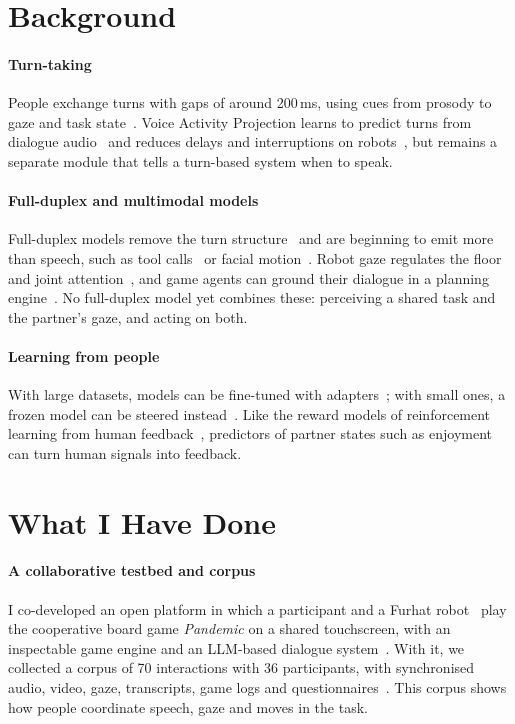 \documentclass[sigconf,review,anonymous,nonacm]{acmart}
\begin{document}
\section{Background}

\paragraph{Turn-taking} People exchange turns with gaps of around 200\,ms, using cues from prosody to gaze and task state~\cite{skantze2021turn}. Voice Activity Projection learns to predict turns from dialogue audio~\cite{ekstedt2022vap} and reduces delays and interruptions on robots~\cite{skantze2025applying}, but remains a separate module that tells a turn-based system when to speak.

\paragraph{Full-duplex and multimodal models} Full-duplex models remove the turn structure~\cite{defossez2024moshi} and are beginning to emit more than speech, such as tool calls~\cite{zhang2026duplexsla} or facial motion~\cite{jiang2026moshiface}. Robot gaze regulates the floor and joint attention~\cite{admoni2017social}, and game agents can ground their dialogue in a planning engine~\cite{bakhtin2022cicero}. No full-duplex model yet combines these: perceiving a shared task and the partner's gaze, and acting on both.

\paragraph{Learning from people} With large datasets, models can be fine-tuned with adapters~\cite{hu2022lora}; with small ones, a frozen model can be steered instead~\cite{yang2021fudge,rimsky2024caa}. Like the reward models of reinforcement learning from human feedback~\cite{christiano2017deep}, predictors of partner states such as enjoyment~\cite{pereira2024multimodal} can turn human signals into feedback.

\section{What I Have Done}

\paragraph{A collaborative testbed and corpus} I co-developed an open platform in which a participant and a Furhat robot~\cite{al2012furhat} play the cooperative board game \emph{Pandemic} on a shared touchscreen, with an inspectable game engine and an LLM-based dialogue system~\cite{anon2026platform}. With it, we collected a corpus of 70 interactions with 36 participants, with synchronised audio, video, gaze, transcripts, game logs and questionnaires~\cite{anon2026dataset}. This corpus shows how people coordinate speech, gaze and moves in the task.
\end{document}
